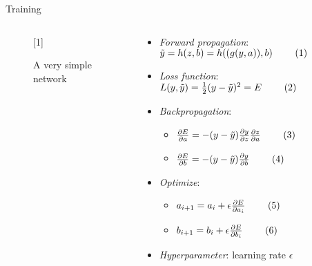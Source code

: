 \documentclass[usenames,dvipsnames,Nike,mathserif]{tuberlinbeamer}
\newcommand\inlineeqno{\stepcounter{equation}\ (\theequation)}
\begin{document}
\begin{frame}[fragile]{Training}
	\begin{columns}
		\begin{column}{.5\textwidth}
			\begin{figure}
				\scalebox{1}[1]{}
				\caption{A very simple network}
			\end{figure}
		\end{column}
	\begin{column}{.5\textwidth}
		\begin{itemize}
			\item \emph{Forward propagation}: $\tilde{y}=h(z,b)=h((g(y,a)),b) \qquad\inlineeqno$ 
			\item<2-> \emph{Loss function}: $L(y,\tilde{y})=
			\frac{1}{2}(y - \tilde{y})^2 = E\qquad\inlineeqno$
			\item<3-> \emph{Backpropagation}:
			\begin{itemize}
				\item<4-> $\frac{\partial E}{\partial a} =
				-(y - \tilde{y})\frac{\partial y}{\partial z}\frac{\partial z}{\partial a}\qquad\inlineeqno$
				\item<4-> $\frac{\partial E}{\partial b} =
				-(y - \tilde{y})\frac{\partial y}{\partial b}\qquad\inlineeqno$ 
			\end{itemize} 
			\item<5-> \emph{Optimize}:
				\begin{itemize}
					\item<5->$a_{i+1}=a_i + \epsilon \frac{\partial E}{\partial a_i}\qquad\inlineeqno$
					\item<5->$b_{i+1}=b_i + \epsilon \frac{\partial E}{\partial b_i}\qquad\inlineeqno$
				\end{itemize}
			\item<6-> \emph{Hyperparameter}: learning rate $\epsilon$
		\end{itemize}
	\end{column}
	\end{columns}
\end{frame}
\end{document}

